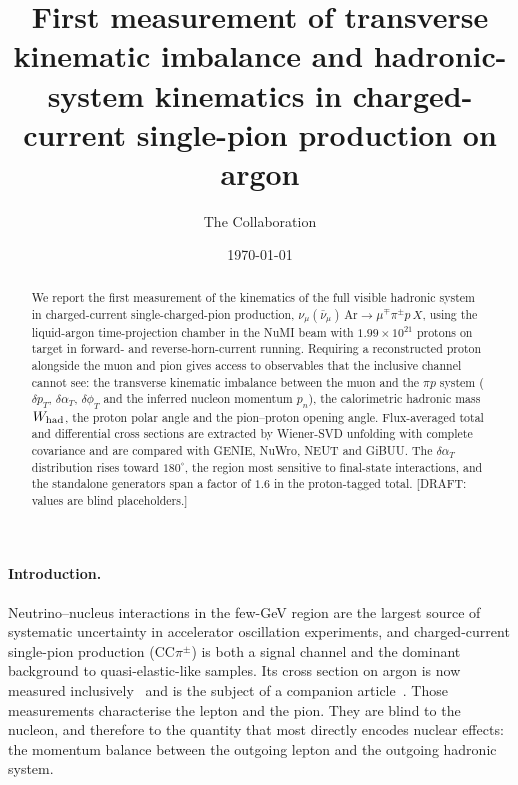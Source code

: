 \documentclass[aps,prl,twocolumn,superscriptaddress,nofootinbib,floatfix]{revtex4-2}
\begin{document}
\title{First measurement of transverse kinematic imbalance and hadronic-system kinematics in
  charged-current single-pion production on argon}

\author{The \uboone{} Collaboration}
\noaffiliation

\date{\today}

\begin{abstract}
We report the first measurement of the kinematics of the full visible hadronic system in
charged-current single-charged-pion production, $\nu_\mu(\bar\nu_\mu)\,\mathrm{Ar}\to
\mu^\mp\pi^\pm p\,X$, using the \uboone{} liquid-argon time-projection chamber in the NuMI beam
with $1.99\times10^{21}$ protons on target in forward- and reverse-horn-current running. Requiring
a reconstructed proton alongside the muon and pion gives access to observables that the inclusive
channel cannot see: the transverse kinematic imbalance between the muon and the $\pi p$ system
($\delta p_T$, $\delta\alpha_T$, $\delta\phi_T$ and the inferred nucleon momentum $p_n$), the
calorimetric hadronic mass $W_{\rm had}$, the proton polar angle and the pion--proton opening
angle. Flux-averaged total and differential cross sections are extracted by Wiener-SVD unfolding
with complete covariance and are compared with GENIE, NuWro, NEUT and GiBUU. The $\delta\alpha_T$
distribution rises toward $180^\circ$, the region most sensitive to final-state interactions, and
the standalone generators span a factor of $1.6$ in the proton-tagged total. [DRAFT: values are
blind placeholders.]
\end{abstract}

\maketitle
\draftbanner

\paragraph*{Introduction.}
Neutrino--nucleus interactions in the few-GeV region are the largest source of systematic
uncertainty in accelerator oscillation experiments, and charged-current single-pion production
(CC$\pi^\pm$) is both a signal channel and the dominant background to quasi-elastic-like samples.
Its cross section on argon is now measured
inclusively~\cite{uboone_bnb2026_ccpi,uboone_nue_ccpi} and is the subject of a companion
article~\cite{companion_prd}. Those measurements characterise the lepton and the pion. They are
blind to the nucleon, and therefore to the quantity that most directly encodes nuclear effects:
the momentum balance between the outgoing lepton and the outgoing hadronic system.
\end{document}
